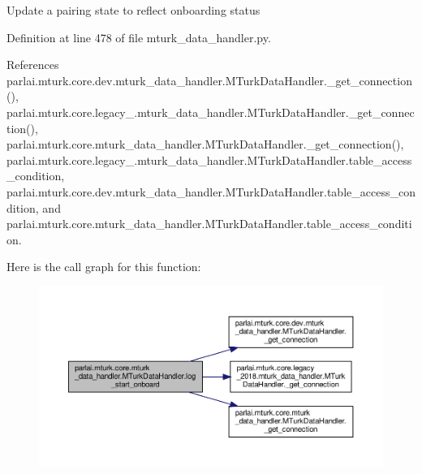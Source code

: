 \begin{DoxyVerb}Update a pairing state to reflect onboarding status\end{DoxyVerb}
 

Definition at line 478 of file mturk\+\_\+data\+\_\+handler.\+py.



References parlai.\+mturk.\+core.\+dev.\+mturk\+\_\+data\+\_\+handler.\+M\+Turk\+Data\+Handler.\+\_\+get\+\_\+connection(), parlai.\+mturk.\+core.\+legacy\+\_.\+mturk\+\_\+data\+\_\+handler.\+M\+Turk\+Data\+Handler.\+\_\+get\+\_\+connection(), parlai.\+mturk.\+core.\+mturk\+\_\+data\+\_\+handler.\+M\+Turk\+Data\+Handler.\+\_\+get\+\_\+connection(), parlai.\+mturk.\+core.\+legacy\+\_.\+mturk\+\_\+data\+\_\+handler.\+M\+Turk\+Data\+Handler.\+table\+\_\+access\+\_\+condition, parlai.\+mturk.\+core.\+dev.\+mturk\+\_\+data\+\_\+handler.\+M\+Turk\+Data\+Handler.\+table\+\_\+access\+\_\+condition, and parlai.\+mturk.\+core.\+mturk\+\_\+data\+\_\+handler.\+M\+Turk\+Data\+Handler.\+table\+\_\+access\+\_\+condition.

Here is the call graph for this function\+:
\nopagebreak
\begin{figure}[H]
\begin{center}
\leavevmode
\includegraphics[width=350pt]{classparlai_1_1mturk_1_1core_1_1mturk__data__handler_1_1MTurkDataHandler_a532f8c2794a6eccf008e7ed9c945e2cb_cgraph}
\end{center}
\end{figure}
\mbox{\label{classparlai_1_1mturk_1_1core_1_1mturk__data__handler_1_1MTurkDataHandler_a373fe84924d3235c1b461f679c9a0926}} 
